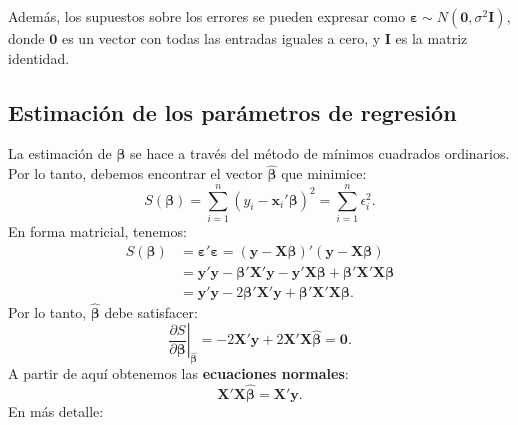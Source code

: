 \documentclass[
]{article}
\begin{document}
Además, los supuestos sobre los errores se pueden expresar como \(\boldsymbol \varepsilon\sim N(\boldsymbol 0, \sigma^{2}\boldsymbol I)\), donde \(\boldsymbol 0\) es un vector con todas las entradas iguales a cero, y \(\boldsymbol I\) es la matriz identidad.

\hypertarget{estimaciuxf3n-de-los-paruxe1metros-de-regresiuxf3n}{%
\subsection{Estimación de los parámetros de regresión}\label{estimaciuxf3n-de-los-paruxe1metros-de-regresiuxf3n}}

La estimación de \(\boldsymbol \beta\) se hace a través del método de mínimos cuadrados ordinarios. Por lo tanto, debemos encontrar el vector \(\widehat{\boldsymbol \beta}\) que minimice:
\[
S(\boldsymbol \beta) =  \sum_{i=1}^{n}\left(y_{i} - \boldsymbol x_{i}'\boldsymbol \beta\right)^2 = \sum_{i=1}^{n}\epsilon_{i}^2.
\]
En forma matricial, tenemos:
\begin{equation}
\begin{split}
S(\boldsymbol \beta) &= \boldsymbol \varepsilon'\boldsymbol \varepsilon= (\boldsymbol y- \boldsymbol X\boldsymbol \beta)'(\boldsymbol y- \boldsymbol X\boldsymbol \beta) \\
&= \boldsymbol y'\boldsymbol y- \boldsymbol \beta'\boldsymbol X'\boldsymbol y- \boldsymbol y'\boldsymbol X\boldsymbol \beta+ \boldsymbol \beta'\boldsymbol X'\boldsymbol X\boldsymbol \beta\\
&= \boldsymbol y'\boldsymbol y- 2\boldsymbol \beta'\boldsymbol X'\boldsymbol y+ \boldsymbol \beta'\boldsymbol X'\boldsymbol X\boldsymbol \beta.
\end{split}
\nonumber
\end{equation}
Por lo tanto, \(\widehat{\boldsymbol \beta}\) debe satisfacer:
\[
\left. \frac{\partial S}{\partial \boldsymbol \beta} \right|_{\widehat{\boldsymbol \beta}} = - 2\boldsymbol X'\boldsymbol y+ 2\boldsymbol X'\boldsymbol X\widehat{\boldsymbol \beta}= \boldsymbol 0.
\]
A partir de aquí obtenemos las \textbf{ecuaciones normales}:
\[
\boldsymbol X'\boldsymbol X\widehat{\boldsymbol \beta}= \boldsymbol X'\boldsymbol y.
\]
En más detalle:
\end{document}
